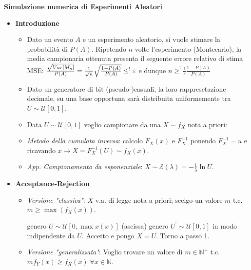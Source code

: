 \documentclass[8pt]{extarticle}
\begin{document}
\begin{multicols*}{3}
    \hfill \break
    \textbf{\underline{Simulazione numerica di Esperimenti Aleatori}}
    \begin{itemize}
        \item \textbf{Introduzione}
              \begin{itemize}
                  \item Dato un evento $A$ e un esperimento aleatorio, si vuole stimare la probabilità di $P(A)$. Ripetendo $n$ volte l'esperimento (Montecarlo), la media campionaria ottenuta presenta il seguente errore relativo di stima MSE: $\newline \frac{\sqrt{Var[M_{n}]}}{P(A)}=\frac{1}{\sqrt{n}}\sqrt{\frac{1-P(A)}{P(A)}}\leq^{!}\varepsilon$ e dunque $n \geq^{!}\frac{1}{\varepsilon}\frac{1-P(A)}{P(A)}$
                  \item Dato un generatore di bit (pseudo-)casuali, la loro rappresetazione decimale, su una base opportuna sarà distribuita uniformemente tra $U\sim\mathcal{U}[0,1]$.
                  \item Data $U\sim\mathcal{U}[0,1]$ voglio campionare da una $X\sim f_{X}$ nota a priori:
                  \item \textit{Metodo della cumulata inversa}: calcolo $F_{X}(x)$ e $F_{X}^{-1}$ ponendo $F_{X}^{-1} = u$ e ricavando $x \rightarrow X = F_{X}^{-1}(U) \sim f_{X}(x)$.
                  \item \textit{App. Campionamento da esponenziale}: $X\sim\mathcal{E}(\lambda)=-\frac{1}{\lambda}\ln{U}$.
              \end{itemize}
        \item \textbf{Acceptance-Rejection}
              \begin{itemize}
                  \item \textit{Versione "classica"}: $X$ v.a. di legge nota a priori; scelgo un valore $m$ t.c. $m\ge \max{}(f_{X}(x))$.
                        \begin{algorithmic}[1]
                            \State genero $U\sim\mathcal{U}[0,\max{x}(x)]$ (ascissa)
                            \State genero $U^{'}\sim\mathcal{U}[0,1]$ in modo indipendente da $U$.
                            \State Accetto e pongo $X=U$.
                            \Else
                            \State Torno a passo 1.
                            \EndIf
                        \end{algorithmic}
                  \item \textit{Versione "generalizzata"}: Voglio trovare un valore di $m\in\mathbb{N}^{+}$ t.c. $mf_{Y}(x)\ge f_{X}(x)\; \forall x\in\mathbb{N}$.

\end{itemize}
\end{itemize}
\end{multicols*}
\end{document}

